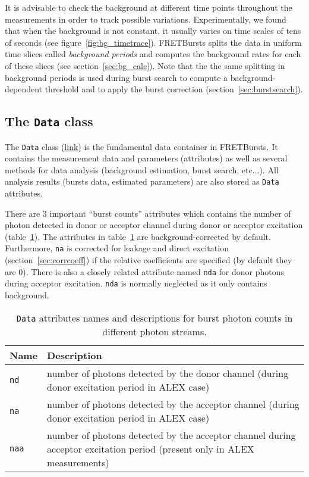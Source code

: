 It is advisable to check the background at different time points
throughout the measurements in order to track possible variations.
Experimentally, we found that when the background is not constant,
it usually varies
on time scales of tens of seconds (see figure~\ref{fig:bg_timetrace}).
FRETBursts splits the data in uniform time
slices called \textit{background periods} and computes the background rates for
each of these slices (see section~\ref{sec:bg_calc}).
Note that the the same splitting in background periods is used during
burst search to compute a background-dependent
threshold and to apply the burst correction (section~\ref{sec:burstsearch}).

\subsection{The \texttt{Data} class}
\label{sec:data_intro}

The \verb|Data| class 
(\href{http://fretbursts.readthedocs.org/en/latest/data_class.html}{link})
is the fundamental data container in FRETBursts. It contains the
measurement data and parameters (attributes) as well as several methods 
for data analysis (background estimation, burst search, etc...). 
All analysis results (bursts data, estimated parameters) are also stored
as \verb|Data| attributes.

There are 3 important ``burst counts'' attributes which contains  
the number of photon detected in donor or acceptor channel
during donor or acceptor excitation (table~\ref{tab:data_n}).
The attributes in table~\ref{tab:data_n} are background-corrected by default. 
Furthermore, \verb|na| is corrected for leakage and direct excitation 
(section~\ref{sec:corrcoeff}) if the relative coefficients are specified 
(by default they are 0).
There is also a closely related attribute named \verb|nda| for donor photons 
during acceptor excitation. \verb|nda| is normally neglected as it only contains
background.

\begin{table}
\begin{tabular}{l p{}}
  Name  & Description \\
  \hline
  \verb|nd| & number of photons detected by the donor channel (during donor excitation period in ALEX case)\\
  \verb|na| & number of photons detected by the acceptor channel (during donor excitation period in ALEX case)\\
  \verb|naa| & number of photons detected by the acceptor channel during acceptor excitation period (present only in ALEX measurements)\\
\end{tabular}
\caption{\label{tab:data_n}\texttt{Data} attributes names and descriptions for burst photon counts in different photon streams.}
\end{table}


